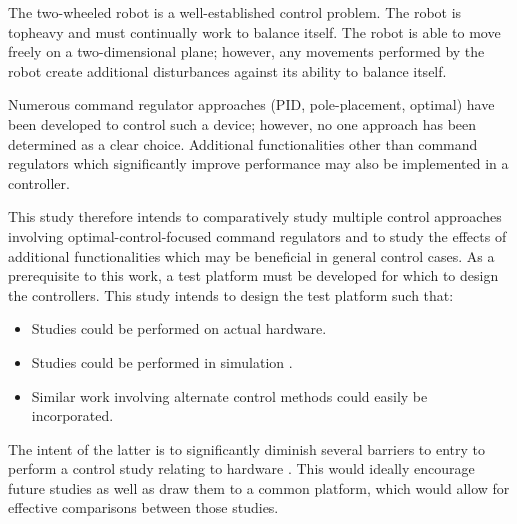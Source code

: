 \documentclass[crop=false,float=true,class=scrreprt]{standalone}
\begin{document}
The two-wheeled robot is a well-established control problem.  
The robot is topheavy and must continually work to balance itself.
The robot is able to move freely on a two-dimensional plane; however,
any movements performed by the robot create additional disturbances
against its ability to balance itself.

Numerous command regulator approaches {\fns\tif(PID, pole-placement, optimal)} 
have been developed to control such a device;
however, no one approach has been determined as a clear choice.
Additional functionalities other than command regulators 
which significantly improve performance
may also be implemented in a controller.

This study therefore intends to comparatively study 
multiple control approaches involving optimal-control-focused command regulators
and to study the effects of additional functionalities which may be beneficial in general control cases.
As a prerequisite to this work, a test platform must be developed for which to design the controllers.
This study intends to design the test platform such that:

\vspace{-0.5em}

\begin{itemize}[leftmargin=*, label=$\vcenter{\hbox{\tiny$\bullet$}}$]

\item Studies could be performed on actual hardware.

\item Studies could be performed in simulation {\fns{}}.

\item Similar work involving alternate control methods could easily be incorporated.

\end{itemize}

\vspace{-0.5em}

The intent of the latter is to significantly diminish
several barriers to entry to perform a control study relating to hardware 
{\fns{}}.
This would ideally encourage future studies 
as well as draw them to a common platform,
which would allow for effective comparisons between those studies.




\clearpage
\end{document}

